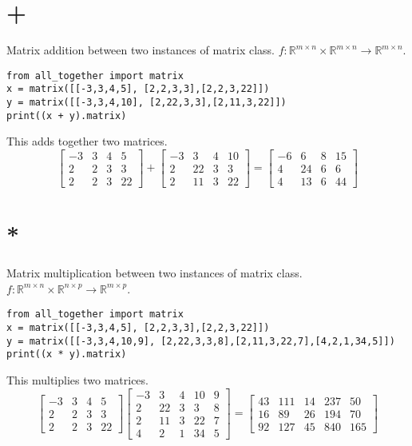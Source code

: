 \documentclass{article}
\begin{document}
\section{+}
Matrix addition between two instances of matrix class. \(f:\mathbb{R}^{m\times n} \times \mathbb{R}^{m \times n} \rightarrow \mathbb{R}^{m \times n}\).
\begin{lstlisting}
from all_together import matrix
x = matrix([[-3,3,4,5], [2,2,3,3],[2,2,3,22]])
y = matrix([[-3,3,4,10], [2,22,3,3],[2,11,3,22]])
print((x + y).matrix) 
\end{lstlisting}
This adds together two matrices. 
\begin{equation}
    \left[
    \begin{array}{cccc}
    -3 & 3 & 4 &5   \\
     2&2&3&3 \\
     2&2&3&22
    \end{array}
    \right]
    +
    \left[
    \begin{array}{cccc}
    -3 & 3 & 4 &10   \\
     2&22&3&3 \\
     2&11&3&22
    \end{array}
    \right]
    =
    \left[
    \begin{array}{cccc}
        -6 & 6&8&15 \\
        4 &24&6&6\\
        4&13&6&44
    \end{array}
    \right]
\end{equation}

\section{*}
Matrix multiplication between two instances of matrix class. \(f:\mathbb{R}^{m\times n} \times \mathbb{R}^{n \times p} \rightarrow \mathbb{R}^{m \times p}\).
\begin{lstlisting}
from all_together import matrix
x = matrix([[-3,3,4,5], [2,2,3,3],[2,2,3,22]])
y = matrix([[-3,3,4,10,9], [2,22,3,3,8],[2,11,3,22,7],[4,2,1,34,5]])
print((x * y).matrix) 
\end{lstlisting}
This multiplies two matrices.
\begin{equation}
\left[
    \begin{array}{cccc}
        -3 &3&4&5  \\
         2&2&3&3\\
         2&2&3&22
    \end{array}
\right]
    \left[
    \begin{array}{ccccc}
        -3 &3&4&10&9  \\
         2&22&3&3&8\\
         2&11&3&22&7\\
         4&2&1&34&5
    \end{array}
    \right] 
    =
    \left[
    \begin{array}{ccccc}
        43 &111&14&237&50  \\
         16&89&26&194&70\\
         92&127&45&840&165
    \end{array}
    \right]
\end{equation}
\end{document}

